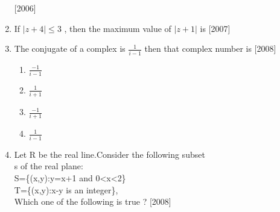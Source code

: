 \documentclass[journal,12pt,twocolumn,article]{IEEEtran}
\theoremstyle{remark}
\begin{document}
\begin{enumerate}[start = 14]
\hfill{[2006]}
\begin{enumerate}
\end{enumerate}
\item If $|z+4|\leq 3$ , then the maximum value of $|z+1|$ is
\hfill{[2007]}                                     
\begin{enumerate}                                  
\end{enumerate}
\item The conjugate of a complex is $\frac{1}{i-1}$ then that complex number is
\hfill{[2008]}
\begin{multicols}{4}
\begin{enumerate}
\item $\frac{-1}{i-1}$
\item $\frac{1}{i+1}$
\item $\frac{-1}{i+1}$
\item $\frac{1}{i-1}$
\end{enumerate}
\end{multicols}
\item Let R be the real line.Consider the following
subset \\s of the real plane: \\S=\{(x,y):y=x+1 and 0{\textless}x{\textless}2\} \\ T=\{(x,y):x-y is an integer\}, \\Which one of the following is true ?
\hfill{[2008]}
\begin{enumerate}

\end{enumerate}
\end{enumerate}
\end{document}
